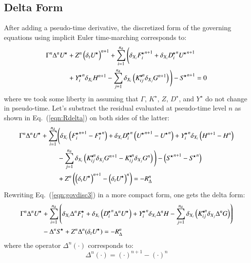 \documentclass{warpdoc}
\newcommand{\alb}{\vspace{0.2cm}\\} %
\newcommand{\mfd}{\displaystyle}
\newcommand{\nd}{{n_{\rm d}}}
\newcommand{\Dstar}{D^{\!\star}}
\newcommand{\Fstar}{F^{\!\star}}
\newcommand{\Ustar}{U^{\!\star}}
\newcommand{\Sstar}{S^{\!\star}}
\newcommand{\Kstar}{K^{\!\star}}
\newcommand{\Ystar}{Y^{\!\star}}
\begin{document}
\subsection{Delta Form}

After adding a pseudo-time derivative, the discretized form of the governing equations using implicit Euler
time-marching corresponds to:
%
\begin{align}
   \Gamma^n {\Delta^n {\Ustar}}&+  Z^n \left(\delta_t \Ustar\right)^{n+1}+   \sum_{i=1}^{\nd}
      \Bigg(  \delta_{X_i} {{\Fstar_i}^{n+1}}
            + \delta_{X_i} {\Dstar_i}^{n} {\Ustar}^{n+1}
\nonumber\alb
            &+ {\Ystar_i}^n \delta_{X_i} H^{n+1}
            - \sum_{j=1}^{\nd} \delta_{X_i} \left( {\Kstar_{ij}}^{\!\! n} \delta_{X_j} G^{n+1}\right) \Bigg) 
 - {\Sstar}^{n+1}=0
\label{eqn:govdisc2}
\end{align}
%
where we took some liberty in assuming that $\Gamma$, $\Kstar$, $Z$, $\Dstar$, and $\Ystar$ do not change in
pseudo-time.
Let's substract the residual evaluated at pseudo-time level $n$ as shown in Eq.\ (\ref{eqn:Rdelta}) on both sides of the latter:
%
\begin{align}
   \mfd \Gamma^n {\Delta^n {\Ustar}}
 +   \sum_{i=1}^{\nd}
      &\Bigg( \delta_{X_i} \left({{\Fstar_i}^{n+1}}-{{\Fstar_i}^{n}}\right)
          + \delta_{X_i} {\Dstar_i}^{n} \left( {\Ustar}^{n+1}-{\Ustar}^{n}\right)
          + {\Ystar_i}^n \delta_{X_i} \left(H^{n+1}-H^n \right)
              \nonumber\alb
          &- \sum_{j=1}^{\nd} \delta_{X_i}
        \left({\Kstar_{ij}}^{\!\! n} \delta_{X_j} G^{n+1}
        -{\Kstar_{ij}}^{\!\! n} \delta_{X_j} G^{n}\right)
          \Bigg)-\left({\Sstar}^{n+1} -{\Sstar}^n \right)\nonumber\alb
        &+ Z^n \left(\left(\delta_t \Ustar\right)^{n+1}-\left(\delta_t \Ustar\right)^n \right)
= -R_\Delta^n
\label{eqn:govdisc3}
\end{align}
%
Rewriting Eq.~(\ref{eqn:govdisc3}) in a more compact form, one gets the
delta form:
%
\begin{align}
   \mfd\Gamma^n{\Delta^n {\Ustar}}
   &+\sum_{i=1}^{\nd}\left( \delta_{X_i}  {\Delta^n {\Fstar_i}}
          + \delta_{X_i} \left({\Dstar_i}^{n} \Delta^n {\Ustar}\right)
          + {\Ystar_i}^n \delta_{X_i}  \Delta^n H
            - \sum_{j=1}^{\nd} \delta_{X_i}
           \left( {\Kstar_{ij}}^{\!\! n} \delta_{X_j}
                 {\Delta^{n} G}\right) \right)\nonumber\alb
  &-\Delta^n {\Sstar}+ Z^n \Delta^n(\delta_t \Ustar) = -R_{\Delta}^n
\label{eqn:deltaform}
\end{align}
%
where the operator $\Delta^n(\cdot)$ corresponds to:
%
\begin{equation}
\Delta^n(\cdot) = (\cdot)^{n+1}-(\cdot)^n
\end{equation}
%
\end{document}
